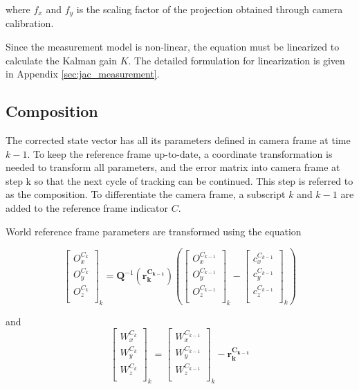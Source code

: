\noindent where $f_{x}$ and $f_{y}$ is the scaling factor of the projection 
obtained through camera calibration.

Since the measurement model is non-linear, the equation must be
linearized to calculate the Kalman gain $K$. The detailed formulation for
linearization is given in Appendix \ref{sec:jac_measurement}.

\subsection{Composition}

The corrected state vector has all its parameters defined in camera
frame at time $k-1$. To keep the reference frame up-to-date, a coordinate
transformation is needed to transform all parameters, and the error matrix
into camera frame at step k so that the next cycle of tracking can be
continued. This step is referred to as the composition. To
differentiate the camera frame, a subscript $k$ and $k-1$ are added to
the reference frame indicator $C$.

World reference frame parameters are transformed using the equation

\begin{equation}
\begin{bmatrix}
O_{x}^{C_{k}} \\
O_{y}^{C_k} \\
O_{z}^{C_k} \\
\end{bmatrix}_{k}=\boldsymbol{Q}^{-1}(\boldsymbol{r_{k}^{C_{k-1}}})\left(
\begin{bmatrix}
O_{x}^{C_{k-1}} \\
O_{y}^{C_{k-1}} \\
O_{z}^{C_{k-1}} \\
\end{bmatrix}_{k}- \begin{bmatrix}
c_{x}^{C_{k-1}} \\
c_{y}^{C_{k-1}} \\
c_{z}^{C_{k-1}} \\
\end{bmatrix}_{k}\right)
\end{equation}

\noindent and
\begin{equation}
\begin{bmatrix}
W_{x}^{C_{k}} \\
W_{y}^{C_{k}} \\
W_{z}^{C_{k}} \\
\end{bmatrix}_{k}= \begin{bmatrix}
W_{x}^{C_{k-1}} \\
W_{y}^{C_{k-1}} \\
W_{z}^{C_{k-1}} \\
\end{bmatrix}_{k}-\boldsymbol{r_k^{C_{k-1}}}
\end{equation}
 
